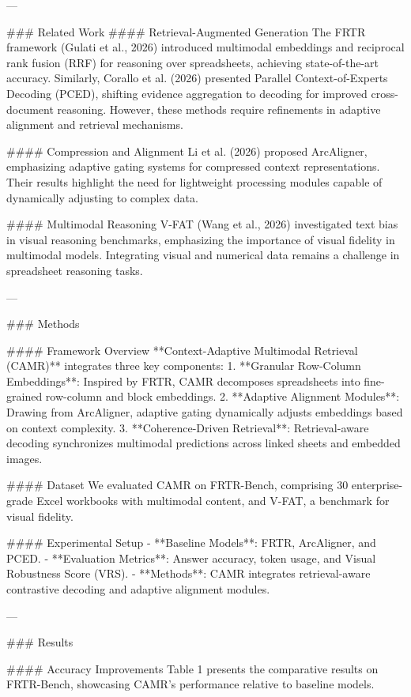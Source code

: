 ---

### Related Work  
#### Retrieval-Augmented Generation  
The FRTR framework (Gulati et al., 2026) introduced multimodal embeddings and reciprocal rank fusion (RRF) for reasoning over spreadsheets, achieving state-of-the-art accuracy. Similarly, Corallo et al. (2026) presented Parallel Context-of-Experts Decoding (PCED), shifting evidence aggregation to decoding for improved cross-document reasoning. However, these methods require refinements in adaptive alignment and retrieval mechanisms.

#### Compression and Alignment  
Li et al. (2026) proposed ArcAligner, emphasizing adaptive gating systems for compressed context representations. Their results highlight the need for lightweight processing modules capable of dynamically adjusting to complex data.

#### Multimodal Reasoning  
V-FAT (Wang et al., 2026) investigated text bias in visual reasoning benchmarks, emphasizing the importance of visual fidelity in multimodal models. Integrating visual and numerical data remains a challenge in spreadsheet reasoning tasks.

---

### Methods  

#### Framework Overview  
**Context-Adaptive Multimodal Retrieval (CAMR)** integrates three key components:  
1. **Granular Row-Column Embeddings**: Inspired by FRTR, CAMR decomposes spreadsheets into fine-grained row-column and block embeddings.  
2. **Adaptive Alignment Modules**: Drawing from ArcAligner, adaptive gating dynamically adjusts embeddings based on context complexity.  
3. **Coherence-Driven Retrieval**: Retrieval-aware decoding synchronizes multimodal predictions across linked sheets and embedded images.

#### Dataset  
We evaluated CAMR on FRTR-Bench, comprising 30 enterprise-grade Excel workbooks with multimodal content, and V-FAT, a benchmark for visual fidelity.  

#### Experimental Setup  
- **Baseline Models**: FRTR, ArcAligner, and PCED.  
- **Evaluation Metrics**: Answer accuracy, token usage, and Visual Robustness Score (VRS).  
- **Methods**: CAMR integrates retrieval-aware contrastive decoding and adaptive alignment modules.

---

### Results  

#### Accuracy Improvements  
Table 1 presents the comparative results on FRTR-Bench, showcasing CAMR's performance relative to baseline models.  

